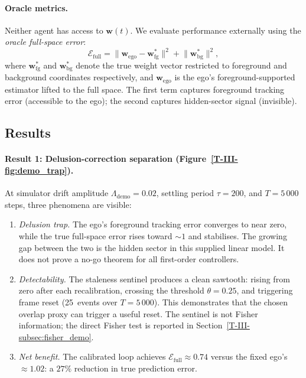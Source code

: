 \documentclass[12pt,a4paper,openany]{book}
\begin{document}
\paragraph{Oracle metrics.}
Neither agent has access to $\mathbf{w}(t)$.
We evaluate performance externally using the \emph{oracle
full-space error}:
\begin{equation}
\label{T-III-eq:oracle_error}
\mathcal{E}_{\mathrm{full}}
= \bigl\|\mathbf{w}_{\mathrm{ego}}
  - \mathbf{w}^*_{\mathrm{fg}}\bigr\|^2
+ \bigl\|\mathbf{w}^*_{\mathrm{bg}}\bigr\|^2,
\end{equation}
where $\mathbf{w}^*_{\mathrm{fg}}$ and
$\mathbf{w}^*_{\mathrm{bg}}$ denote the true weight vector
restricted to foreground and background coordinates
respectively, and $\mathbf{w}_{\mathrm{ego}}$ is the ego's
foreground-supported estimator lifted to the full space.
The first term captures foreground tracking error (accessible
to the ego); the second captures hidden-sector signal
(invisible).

\subsection{Results}
\label{T-III-subsec:demo_results}

\paragraph{Result 1: Delusion-correction separation
(Figure~\ref{T-III-fig:demo_trap}).}
At simulator drift amplitude $\Lambda_{\mathrm{demo}} = 0.02$,
settling period $\tau = 200$,
and $T = 5\,000$ steps, three phenomena are visible:

\begin{enumerate}
\item[(a)]
\emph{Delusion trap.}
The ego's foreground tracking error converges
to near zero, while the true full-space error rises
toward $\sim\!1$ and stabilises.
The growing gap between the two is the hidden sector in this supplied
linear model.  It does not prove a no-go theorem for all first-order
controllers.

\item[(b)]
\emph{Detectability.}
The staleness sentinel produces a clean sawtooth:
rising from zero after each recalibration, crossing the
threshold $\theta = 0.25$, and triggering frame reset
(25~events over $T = 5\,000$).
This demonstrates that the chosen overlap proxy can trigger a useful
reset.  The sentinel is not Fisher information; the direct Fisher test
is reported in Section~\ref{T-III-subsec:fisher_demo}.

\item[(c)]
\emph{Net benefit.}
The calibrated loop achieves
$\mathcal{E}_{\mathrm{full}} \approx 0.74$
versus the fixed ego's $\approx 1.02$:
a $27\%$ reduction in true prediction error.
\end{enumerate}
\end{document}
